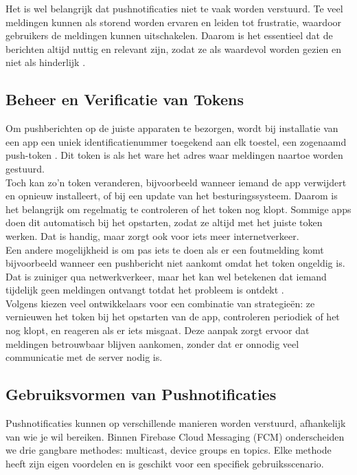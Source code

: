 Het is wel belangrijk dat pushnotificaties niet te vaak worden verstuurd. Te veel meldingen kunnen als storend worden ervaren en leiden tot frustratie, waardoor gebruikers de meldingen kunnen uitschakelen. Daarom is het essentieel dat de berichten altijd nuttig en relevant zijn, zodat ze als waardevol worden gezien en niet als hinderlijk \autocite{Wohllebe2021}.\\

\subsection{Beheer en Verificatie van Tokens}
Om pushberichten op de juiste apparaten te bezorgen, wordt bij installatie van een app een uniek identificatienummer toegekend aan elk toestel, een zogenaamd push-token \autocite{pushwoosh2025}. Dit token is als het ware het adres waar meldingen naartoe worden gestuurd.\\

Toch kan zo’n token veranderen, bijvoorbeeld wanneer iemand de app verwijdert en opnieuw installeert, of bij een update van het besturingssysteem. Daarom is het belangrijk om regelmatig te controleren of het token nog klopt. Sommige apps doen dit automatisch bij het opstarten, zodat ze altijd met het juiste token werken. Dat is handig, maar zorgt ook voor iets meer internetverkeer.\\

Een andere mogelijkheid is om pas iets te doen als er een foutmelding komt bijvoorbeeld wanneer een pushbericht niet aankomt omdat het token ongeldig is. Dat is zuiniger qua netwerkverkeer, maar het kan wel betekenen dat iemand tijdelijk geen meldingen ontvangt totdat het probleem is ontdekt \autocite{pushwoosh2025}.\\

Volgens \textcite{pushwoosh2025} kiezen veel ontwikkelaars voor een combinatie van strategieën: ze vernieuwen het token bij het opstarten van de app, controleren periodiek of het nog klopt, en reageren als er iets misgaat. Deze aanpak zorgt ervoor dat meldingen betrouwbaar blijven aankomen, zonder dat er onnodig veel communicatie met de server nodig is.\\

\subsection{Gebruiksvormen van Pushnotificaties}

Pushnotificaties kunnen op verschillende manieren worden verstuurd, afhankelijk van wie je wil bereiken. Binnen Firebase Cloud Messaging (FCM) onderscheiden we drie gangbare methodes: multicast, device groups en topics. Elke methode heeft zijn eigen voordelen en is geschikt voor een specifiek gebruiksscenario.\\

